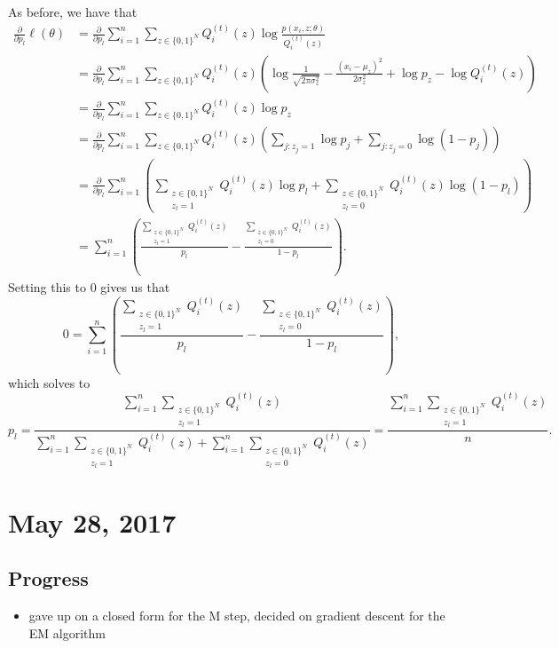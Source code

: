 \documentclass{article}
\begin{document}
\begin{itemize}
  As before, we have that
  \begin{align*}
    \frac{\partial}{\partial p_l}\ell(\theta) &= \frac{\partial}{\partial p_l}\sum_{i=1}^n\sum_{z\in\{0,1\}^N} Q_i^{(t)}(z)\log \frac{p(x_i, z;\theta)}{Q_i^{(t)}(z)} \\
    &= \frac{\partial}{\partial p_l}\sum_{i=1}^n\sum_{z\in\{0,1\}^N} Q_i^{(t)}(z)\left(\log \frac1{\sqrt{2\pi\sigma_z^2}} -\frac{(x_i-\mu_z)^2}{2\sigma_z^2} + \log p_z - \log Q_i^{(t)}(z)\right) \\
    &= \frac{\partial}{\partial p_l}\sum_{i=1}^n\sum_{z\in\{0,1\}^N} Q_i^{(t)}(z)\log p_z \\
    &= \frac{\partial}{\partial p_l}\sum_{i=1}^n\sum_{z\in\{0,1\}^N} Q_i^{(t)}(z)\left(\sum_{j:z_j=1}\log p_j + \sum_{j:z_j=0}\log(1-p_j)\right) \\
    &= \frac{\partial}{\partial p_l}\sum_{i=1}^n\left(\sum_{\substack{z\in\{0,1\}^N \\ z_l = 1}} Q_i^{(t)}(z)\log p_l + \sum_{\substack{z\in\{0,1\}^N \\ z_l = 0}} Q_i^{(t)}(z)\log(1-p_l)\right) \\
    &= \sum_{i=1}^n\left(\frac{\sum_{\substack{z\in\{0,1\}^N \\ z_l = 1}}Q_i^{(t)}(z)}{p_l} - \frac{\sum_{\substack{z\in\{0,1\}^N \\ z_l = 0}}Q_i^{(t)}(z)}{1-p_l}\right).
  \end{align*}
  Setting this to $0$ gives us that
  \[
    0 = \sum_{i=1}^n\left(\frac{\sum_{\substack{z\in\{0,1\}^N \\ z_l = 1}}Q_i^{(t)}(z)}{p_l} - \frac{\sum_{\substack{z\in\{0,1\}^N \\ z_l = 0}}Q_i^{(t)}(z)}{1-p_l}\right),
  \]
  which solves to
  \[
    p_l = \frac{\sum_{i=1}^n\sum_{\substack{z\in\{0,1\}^N \\ z_l = 1}}Q_i^{(t)}(z)}{\sum_{i=1}^n\sum_{\substack{z\in\{0,1\}^N \\ z_l = 1}}Q_i^{(t)}(z) + \sum_{i=1}^n\sum_{\substack{z\in\{0,1\}^N \\ z_l = 0}}Q_i^{(t)}(z)} = \boxed{\frac{\sum_{i=1}^n\sum_{\substack{z\in\{0,1\}^N \\ z_l = 1}}Q_i^{(t)}(z)}n}.
  \]
\end{itemize}

\section{May 28, 2017}

\subsection{Progress}
\begin{itemize}
  \item gave up on a closed form for the M step, decided on gradient descent for the EM algorithm
\end{itemize}
\end{document}
